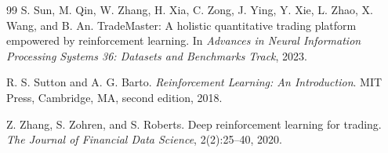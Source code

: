 \documentclass[11pt]{article}
\begin{document}
\begin{thebibliography}{99}
S. Sun, M. Qin, W. Zhang, H. Xia, C. Zong, J. Ying, Y. Xie, L. Zhao,
  X. Wang, and B. An.
\newblock TradeMaster: A holistic quantitative trading platform empowered by
  reinforcement learning.
\newblock In \emph{Advances in Neural Information Processing Systems 36:
  Datasets and Benchmarks Track}, 2023.

R. S. Sutton and A. G. Barto.
\newblock \emph{Reinforcement Learning: An Introduction}.
\newblock MIT Press, Cambridge, MA, second edition, 2018.

Z. Zhang, S. Zohren, and S. Roberts.
\newblock Deep reinforcement learning for trading.
\newblock \emph{The Journal of Financial Data Science}, 2(2):25--40, 2020.

\end{thebibliography}
\end{document}
